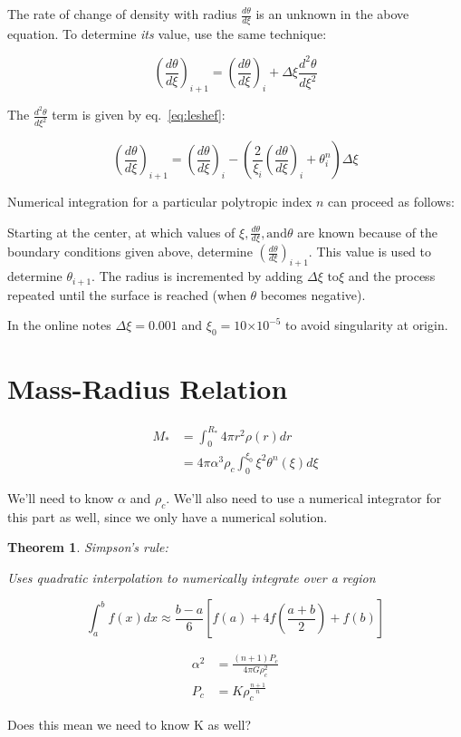 \documentclass{article}
\providecommand{\e}[1]{\ensuremath{\times 10^{#1}}}
\newtheorem{thm}{Theorem}
\begin{document}
    The rate of change of density with radius \(\frac{d\theta}{d\xi}\) is an
    unknown in the above equation. To determine \emph{its} value, use the same
    technique:

    \begin{equation}
        \left(\frac{d\theta}{d\xi}\right)_{i+1}=\left(\frac{d\theta}{d\xi}\right)_{i} +
        \Delta\xi\frac{d^2\theta}{d\xi^2}
    \end{equation}
    
    The \(\frac{d^2\theta}{d\xi^2}\) term is given by eq.~\ref{eq:leshef}:

    \begin{equation}
        \left(\frac{d\theta}{d\xi}\right)_{i+1} =
        \left(\frac{d\theta}{d\xi}\right)_i-\left(\frac{2}{\xi_i}\left(\frac{d\theta}{d\xi}\right)_i+\theta_i^n\right)\Delta\xi
    \end{equation}

    Numerical integration for a particular polytropic index \(n\) can proceed as
    follows:

    Starting at the center, at which values of \(\xi,\frac{d\theta}{d\xi},\text{
    and}\theta\) are known because of the boundary conditions given above,
    determine \(\left(\frac{d\theta}{d\xi}\right)_{i+1}\). This value is used to determine
    \(\theta_{i+1}\). The radius is incremented by adding \(\Delta\xi\text{ to}
    \xi\) and the process repeated until the surface is reached (when \(\theta\)
    becomes negative).

    In the online notes
    \(\Delta\xi=0.001\) and \(\xi_0=10\e{-5}\) to avoid singularity
    at origin.

    \section{Mass-Radius Relation}

        \begin{align*}
            M_*&=\int_0^{R_*}{4\pi r^2 \rho(r)}dr \\
               &=4\pi\alpha^3\rho_c\int_0^{\xi_0}{\xi^2\theta^n(\xi)}d\xi
        \end{align*}

        We'll need to  know \(\alpha\) and \(\rho_c\). We'll also need to use a
        numerical integrator for this part as well, since we only have a
        numerical solution.

        \begin{thm}
            Simpson's rule:

            Uses quadratic interpolation to numerically integrate over a region

            \[\int_a^b{f(x)}dx\approx\frac{b-a}{6}\left[f(a)+4f\left(\frac{a+b}{2}\right)+f(b)\right]\]
        \end{thm}

        \begin{align*}
            \alpha^2&=\frac{(n+1)P_c}{4\pi G\rho_c^2} \\
            P_c&=K\rho_c^{\frac{n+1}{n}}
        \end{align*}

        Does this mean we need to know K as well?
\end{document}
